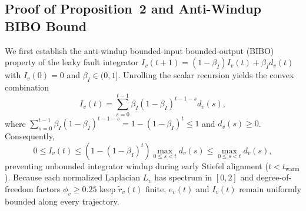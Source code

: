 \documentclass[journal]{IEEEtran}
\begin{document}
\subsection{Proof of Proposition~2 and Anti-Windup BIBO Bound}
We first establish the anti-windup bounded-input bounded-output (BIBO) property of the leaky fault integrator $I_v(t+1) = (1 - \beta_I) I_v(t) + \beta_I d_v(t)$ with $I_v(0) = 0$ and $\beta_I \in (0, 1]$. Unrolling the scalar recursion yields the convex combination
\begin{equation}
I_v(t) = \sum_{s=0}^{t-1} \beta_I (1 - \beta_I)^{t-1-s} d_v(s),
\end{equation}
where $\sum_{s=0}^{t-1} \beta_I (1 - \beta_I)^{t-1-s} = 1 - (1 - \beta_I)^t \le 1$ and $d_v(s) \ge 0$. Consequently,
\begin{equation}
0 \le I_v(t) \le \left(1 - (1 - \beta_I)^t\right)\max_{0 \le s < t} d_v(s) \le \max_{0 \le s < t} d_v(s),
\end{equation}
preventing unbounded integrator windup during early Stiefel alignment ($t < t_{\mathrm{warm}}$). Because each normalized Laplacian $L_v$ has spectrum in $[0, 2]$ and degree-of-freedom factors $\phi_v \ge 0.25$ keep $\tilde{r}_v(t)$ finite, $e_v(t)$ and $I_v(t)$ remain uniformly bounded along every trajectory.
\end{document}
